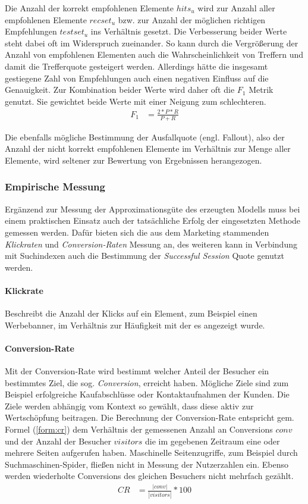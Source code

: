 Die Anzahl der korrekt empfohlenen Elemente $hits_u$ wird zur Anzahl aller empfohlenen Elemente $recset_u$ bzw. zur Anzahl der möglichen richtigen Empfehlungen $testset_u$ ins Verhältnis gesetzt. Die Verbesserung beider Werte steht dabei oft im Widerspruch zueinander. So kann durch die Vergrößerung der Anzahl von empfohlenen Elementen auch die Wahrscheinlichkeit von Treffern und damit die Trefferquote gesteigert werden. Allerdings hätte die insgesamt gestiegene Zahl von Empfehlungen auch einen negativen Einfluss auf die Genauigkeit. Zur Kombination beider Werte wird daher oft die $F_1$ Metrik genutzt. Sie gewichtet beide Werte mit einer Neigung zum schlechteren.
\begin{align}
F_1 & = \frac{2 * P * R}{P+R} \label{form:f1}
\end{align}

Die ebenfalls mögliche Bestimmung der Ausfallquote (engl. Fallout), also der Anzahl der nicht korrekt empfohlenen Elemente im Verhältnis zur Menge aller Elemente, wird seltener zur Bewertung von Ergebnissen herangezogen. \citep{hb_08,rs}

\subsubsection{Empirische Messung}\label{sec:measure_c}

Ergänzend zur Messung der Approximationsgüte des erzeugten Modells muss bei einem praktischen Einsatz auch der tatsächliche Erfolg der eingesetzten Methode gemessen werden. Dafür bieten sich die aus dem Marketing stammenden \textit{Klickraten} und \textit{Conversion-Raten} Messung an, des weiteren kann in Verbindung mit Suchindexen auch die Bestimmung der \textit{Successful Session} Quote genutzt werden.

\paragraph{Klickrate} Beschreibt die Anzahl der Klicks auf ein Element, zum Beispiel einen Werbebanner, im Verhältnis zur Häufigkeit mit der es angezeigt wurde. 

\paragraph{Conversion-Rate} Mit der Conversion-Rate wird bestimmt welcher Anteil der Besucher ein bestimmtes Ziel, die sog. \textit{Conversion}, erreicht haben. Mögliche Ziele sind zum Beispiel erfolgreiche Kaufabschlüsse oder Kontaktaufnahmen der Kunden. Die Ziele werden abhängig vom Kontext so gewählt, dass diese aktiv zur Wertschöpfung beitragen. Die Berechnung der Conversion-Rate entspricht gem. Formel (\ref{form:cr}) dem Verhältnis der gemessenen Anzahl an Conversions $conv$ und der Anzahl der Besucher $visitors$ die im gegebenen Zeitraum eine oder mehrere Seiten aufgerufen haben. Maschinelle Seitenzugriffe, zum Beispiel durch Suchmaschinen-Spider, fließen nicht in Messung der Nutzerzahlen ein. Ebenso werden wiederholte Conversions des gleichen Besuchers nicht mehrfach gezählt. \citep{krueger2011conversion}
\begin{align}
CR & = \frac{|conv|}{|visitors| } * 100 \label{form:cr}
\end{align}

